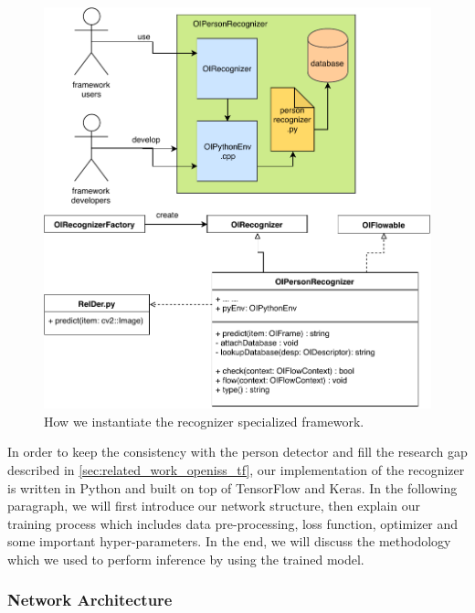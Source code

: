 \begin{figure}
    \centering
    \includegraphics[scale=0.8]{figures/framework_inst_recognizer.pdf}
    \caption{How we instantiate the recognizer specialized framework.}
    \label{fig:fw-inst-recognizer}
\end{figure}

In order to keep the consistency with the person detector and fill the
research gap described in \autoref{sec:related_work_openiss_tf}, our 
implementation of the recognizer is written in Python and built on top of 
TensorFlow and Keras.
In the following paragraph, we will first introduce our network structure, then
explain our training process which includes data pre-processing, loss 
function,  optimizer and some important hyper-parameters.
In the end, we will discuss the methodology which we used to perform inference
by using the trained model.

\subsubsection{Network Architecture}
\label{fw-recognizer-spec-network-arch}

